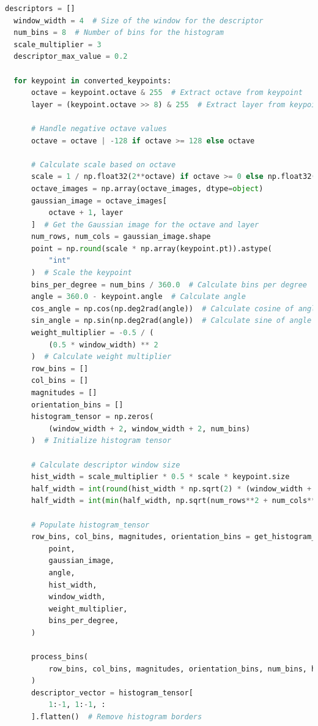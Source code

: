 \documentclass[11pt,a4paper]{article}
\begin{document}
\begin{lstlisting}[language=Python, caption=Keypoint descriptor]
  descriptors = []
  window_width = 4  # Size of the window for the descriptor
  num_bins = 8  # Number of bins for the histogram
  scale_multiplier = 3
  descriptor_max_value = 0.2

  for keypoint in converted_keypoints:
      octave = keypoint.octave & 255  # Extract octave from keypoint
      layer = (keypoint.octave >> 8) & 255  # Extract layer from keypoint

      # Handle negative octave values
      octave = octave | -128 if octave >= 128 else octave

      # Calculate scale based on octave
      scale = 1 / np.float32(2**octave) if octave >= 0 else np.float32(2**-octave)
      octave_images = np.array(octave_images, dtype=object)
      gaussian_image = octave_images[
          octave + 1, layer
      ]  # Get the Gaussian image for the octave and layer
      num_rows, num_cols = gaussian_image.shape
      point = np.round(scale * np.array(keypoint.pt)).astype(
          "int"
      )  # Scale the keypoint
      bins_per_degree = num_bins / 360.0  # Calculate bins per degree
      angle = 360.0 - keypoint.angle  # Calculate angle
      cos_angle = np.cos(np.deg2rad(angle))  # Calculate cosine of angle
      sin_angle = np.sin(np.deg2rad(angle))  # Calculate sine of angle
      weight_multiplier = -0.5 / (
          (0.5 * window_width) ** 2
      )  # Calculate weight multiplier
      row_bins = []
      col_bins = []
      magnitudes = []
      orientation_bins = []
      histogram_tensor = np.zeros(
          (window_width + 2, window_width + 2, num_bins)
      )  # Initialize histogram tensor

      # Calculate descriptor window size
      hist_width = scale_multiplier * 0.5 * scale * keypoint.size
      half_width = int(round(hist_width * np.sqrt(2) * (window_width + 1) * 0.5))
      half_width = int(min(half_width, np.sqrt(num_rows**2 + num_cols**2)))

      # Populate histogram_tensor
      row_bins, col_bins, magnitudes, orientation_bins = get_histogram_bins(
          point,
          gaussian_image,
          angle,
          hist_width,
          window_width,
          weight_multiplier,
          bins_per_degree,
      )

      process_bins(
          row_bins, col_bins, magnitudes, orientation_bins, num_bins, histogram_tensor
      )
      descriptor_vector = histogram_tensor[
          1:-1, 1:-1, :
      ].flatten()  # Remove histogram borders


\end{lstlisting}
\end{document}
